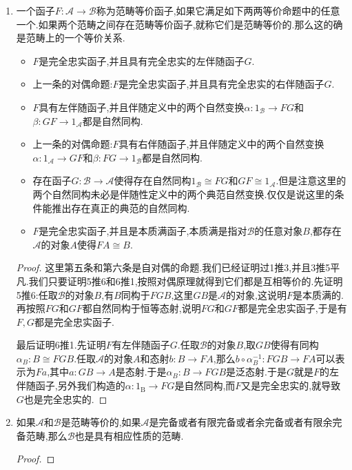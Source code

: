 \begin{enumerate}
\begin{proof}
    	另一方面从$\alpha F\circ F\beta=1_F$得到$F\beta=\alpha^{-1}_F$,就有:
    	\begin{align*}
    	\alpha\circ\tau\circ F\beta H\circ FG\tau^{-1}&=FG\tau\circ FH\alpha\circ F\beta H\circ FG\tau^{-1}\\&=FG\tau\circ F\beta HGF\circ FGFH\alpha\circ FG\tau^{-1}\\&=FG\tau\circ F\beta HFG\circ FG\tau^{-1}FG\circ FG\alpha\\&=FG\tau\circ F\beta HFG\circ FGF\eta G\circ FG\alpha\\&=F1_{C}\circ F1_G=1_{FG}
    	\end{align*}
    \end{proof}
    \item 一个函子$F:\mathscr{A}\to\mathscr{B}$称为范畴等价函子,如果它满足如下两两等价命题中的任意一个.如果两个范畴之间存在范畴等价函子,就称它们是范畴等价的.那么这的确是范畴上的一个等价关系.
    \begin{itemize}
    	\item $F$是完全忠实函子,并且具有完全忠实的左伴随函子$G$.
    	\item 上一条的对偶命题:$F$是完全忠实函子,并且具有完全忠实的右伴随函子$G$.
    	\item $F$具有左伴随函子,并且伴随定义中的两个自然变换$\alpha:1_{\mathscr{B}}\to FG$和$\beta:GF\to1_{\mathscr{A}}$都是自然同构.
    	\item 上一条的对偶命题:$F$具有右伴随函子,并且伴随定义中的两个自然变换$\alpha:1_{\mathscr{A}}\to GF$和$\beta:FG\to1_{\mathscr{B}}$都是自然同构.
    	\item 存在函子$G:\mathscr{B}\to\mathscr{A}$使得存在自然同构$1_{\mathscr{B}}\cong FG$和$GF\cong1_{\mathscr{A}}$.但是注意这里的两个自然同构未必是伴随性定义中的两个典范自然变换.仅仅是说这里的条件能推出存在真正的典范的自然同构.
    	\item $F$是完全忠实函子,并且是本质满函子,本质满是指对$\mathscr{B}$的任意对象$B$,都存在$\mathscr{A}$的对象$A$使得$FA\cong B$.
    \end{itemize}
    \begin{proof}
    	
    	这里第五条和第六条是自对偶的命题.我们已经证明过1推3,并且3推5平凡.我们只要证明5推6和6推1,按照对偶原理就得到它们都是互相等价的.先证明5推6:任取$\mathscr{B}$的对象$B$,有$B$同构于$FGB$,这里$GB$是$\mathscr{A}$的对象,这说明$F$是本质满的.再按照$FG$和$GF$都自然同构于恒等态射,说明$FG$和$GF$都是完全忠实函子,于是有$F,G$都是完全忠实函子.
    	
    	最后证明6推1.先证明$F$有左伴随函子$G$.任取$\mathscr{B}$的对象$B$,取$GB$使得有同构$\alpha_B:B\cong FGB$.任取$\mathscr{A}$的对象$A$和态射$b:B\to FA$,那么$b\circ\alpha_B^{-1}:FGB\to FA$可以表示为$Fa$,其中$a:GB\to A$是态射.于是$\alpha_B:B\to FGB$是泛态射.于是$G$就是$F$的左伴随函子,另外我们构造的$\alpha:1_{\mathrm{B}}\to FG$是自然同构,而$F$又是完全忠实的,就导致$G$也是完全忠实的.
    \end{proof}
    \item 如果$\mathscr{A}$和$\mathscr{B}$是范畴等价的,如果$\mathscr{A}$是完备或者有限完备或者余完备或者有限余完备范畴,那么$\mathscr{B}$也是具有相应性质的范畴.
    \begin{proof}
    	

\end{proof}
\end{enumerate}
